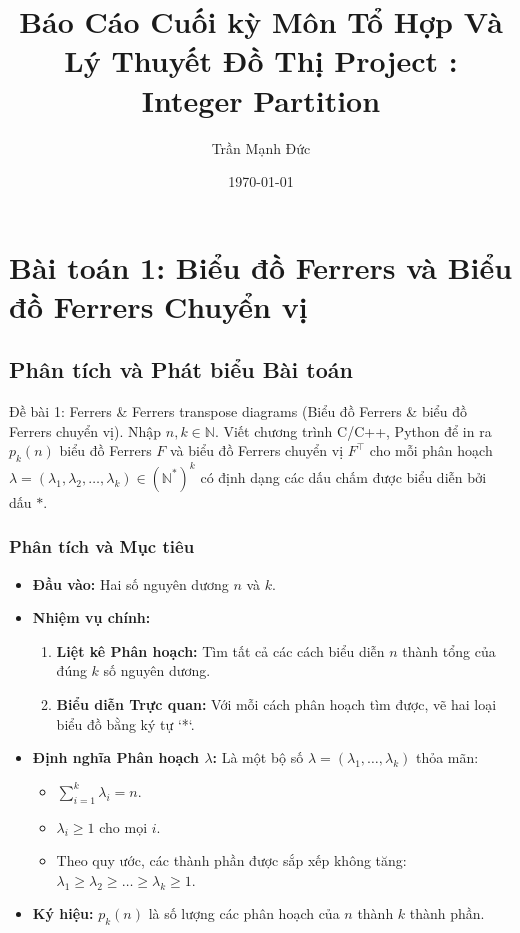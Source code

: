 \documentclass[a4paper,12pt]{article}
\begin{document}
\title{Báo Cáo Cuối kỳ Môn Tổ Hợp Và Lý Thuyết Đồ Thị \newline Project : Integer Partition}
\author{Trần Mạnh Đức}
\date{\today}
\maketitle

\thispagestyle{empty}
\newpage

\tableofcontents
\newpage

\section{Bài toán 1: Biểu đồ Ferrers và Biểu đồ Ferrers Chuyển vị}

\subsection{Phân tích và Phát biểu Bài toán}

\begin{problembox}{Đề bài 1: Ferrers \& Ferrers transpose diagrams}
    (Biểu đồ Ferrers \& biểu đồ Ferrers chuyển vị). Nhập $n, k \in \mathbb{N}$. Viết chương trình C/C++, Python để in ra $p_k(n)$ biểu đồ Ferrers $F$ và biểu đồ Ferrers chuyển vị $F^\top$ cho mỗi phân hoạch $\lambda = (\lambda_1, \lambda_2, \dots, \lambda_k) \in (\mathbb{N}^*)^k$ có định dạng các dấu chấm được biểu diễn bởi dấu $*$.
\end{problembox}

\subsubsection{Phân tích và Mục tiêu}
\begin{itemize}
    \item \textbf{Đầu vào:} Hai số nguyên dương $n$ và $k$.
    \item \textbf{Nhiệm vụ chính:}
    \begin{enumerate}
        \item \textbf{Liệt kê Phân hoạch:} Tìm tất cả các cách biểu diễn $n$ thành tổng của đúng $k$ số nguyên dương.
        \item \textbf{Biểu diễn Trực quan:} Với mỗi cách phân hoạch tìm được, vẽ hai loại biểu đồ bằng ký tự `*`.
    \end{enumerate}
    \item \textbf{Định nghĩa Phân hoạch $\lambda$:} Là một bộ số $\lambda = (\lambda_1, \dots, \lambda_k)$ thỏa mãn:
    \begin{itemize}
        \item $\sum_{i=1}^{k} \lambda_i = n$.
        \item $\lambda_i \ge 1$ cho mọi $i$.
        \item Theo quy ước, các thành phần được sắp xếp không tăng: $\lambda_1 \ge \lambda_2 \ge \dots \ge \lambda_k \ge 1$.
    \end{itemize}
    \item \textbf{Ký hiệu:} $p_k(n)$ là số lượng các phân hoạch của $n$ thành $k$ thành phần.
\end{itemize}
\end{document}
